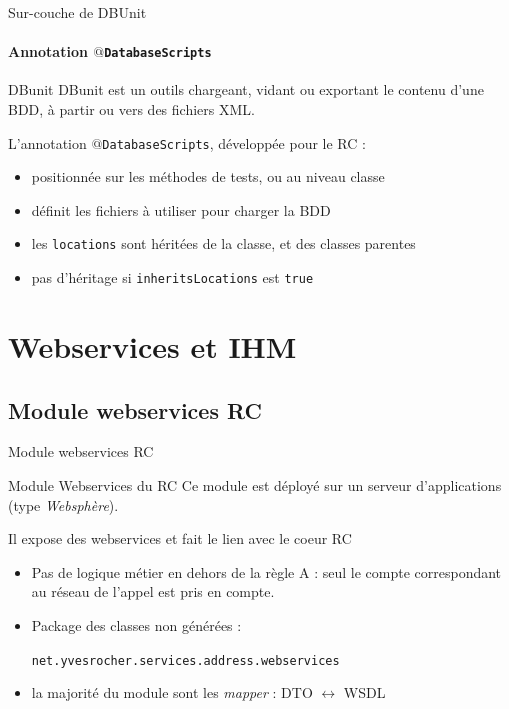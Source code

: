 \documentclass[compact]{beamer}%
\begin{document}
\begin{frame}{Sur-couche de DBUnit}
	\framesubtitle{Annotation \texttt{$@$DatabaseScripts}}
	
	\begin{block}{DBunit}
	DBunit est un outils chargeant, vidant ou exportant le contenu d'une BDD, à partir ou vers des fichiers XML.
	\end{block}
	
	\pause
	L'annotation \texttt{$@$DatabaseScripts}, développée pour le RC :
	\begin{itemize}
	\item positionnée sur les méthodes de tests, ou au niveau classe
	\item définit les fichiers à utiliser pour charger la BDD
	\item les \texttt{locations} sont héritées de la classe, et des classes parentes
	\item pas d'héritage si \texttt{inheritsLocations} est \texttt{true}
	\end{itemize}
\end{frame}

\section{Webservices et IHM}

\subsection{Module webservices RC}

\begin{frame}{Module webservices RC}

	\begin{block}{Module Webservices du RC}
	Ce module est déployé sur un serveur d'applications (type \emph{Websphère}).\par
	Il expose des webservices et fait le lien avec le coeur RC
	\end{block}
	
	\pause
	\begin{itemize}[<+->]
	\item Pas de logique métier en dehors de la règle A : seul le compte correspondant au réseau de l'appel est pris en compte.
	\item Package des classes non générées :\par
	\texttt{net.yvesrocher.services.address.webservices}
	\item la majorité du module sont les \emph{mapper} : DTO $\leftrightarrow$ WSDL
	\end{itemize}

\end{frame}
\end{document}
